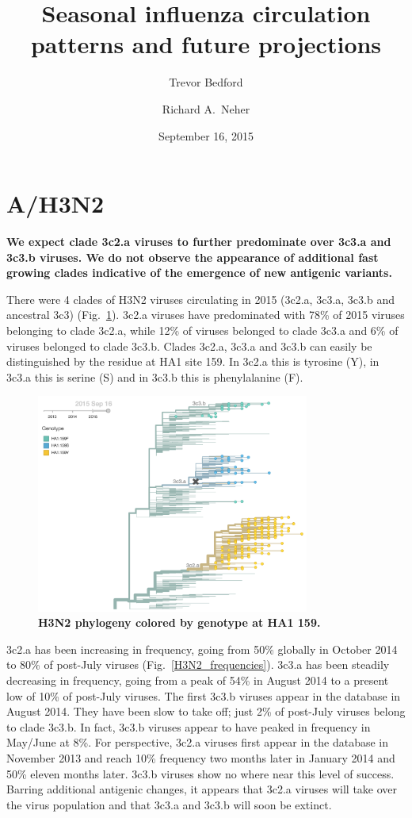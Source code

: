 \documentclass[11pt,oneside,letterpaper]{article}
\title{\vspace{2cm} \Large \bf 
Seasonal influenza circulation patterns and future projections
}
\author[1]{Trevor Bedford}
\author[2]{Richard A.\ Neher}
\affil[1]{Vaccine and Infectious Disease Division, Fred Hutchinson Cancer Research Center, Seattle, WA, USA.}
\affil[2]{Max Planck Institute for Developmental Biology, T\"ubingen, Germany.}
\date{September 16, 2015}
\begin{document}
\maketitle

\pagebreak

\section*{A/H3N2}

\textbf{We expect clade 3c2.a viruses to further predominate over 3c3.a and 3c3.b viruses. We do not observe the appearance of additional fast growing clades indicative of the emergence of new antigenic variants.}

There were 4 clades of H3N2 viruses circulating in 2015 (3c2.a, 3c3.a, 3c3.b and ancestral 3c3) (Fig.~\ref{H3N2_HA1-159}). 3c2.a viruses have predominated with 78\% of 2015 viruses belonging to clade 3c2.a, while 12\% of viruses belonged to clade 3c3.a and 6\% of viruses belonged to clade 3c3.b. Clades 3c2.a, 3c3.a and 3c3.b can easily be distinguished by the residue at HA1 site 159. In 3c2.a this is tyrosine (Y), in 3c3.a this is serine (S) and in 3c3.b this is phenylalanine (F).

\begin{figure}[h!]
	\centering		
	\includegraphics[width=0.8\textwidth]{../figures/sep-2015/H3N2_HA1-159.png}
	\caption{\textbf{H3N2 phylogeny colored by genotype at HA1 159.} 
	}
	\label{H3N2_HA1-159}
\end{figure}

3c2.a has been increasing in frequency, going from 50\% globally in October 2014 to 80\% of post-July viruses (Fig.~\ref{H3N2_frequencies}). 3c3.a has been steadily decreasing in frequency, going from a peak of 54\% in August 2014 to a present low of 10\% of post-July viruses. The first 3c3.b viruses appear in the database in August 2014. They have been slow to take off; just 2\% of post-July viruses belong to clade 3c3.b. In fact, 3c3.b viruses appear to have peaked in frequency in May/June at 8\%. For perspective, 3c2.a viruses first appear in the database in November 2013 and reach 10\% frequency two months later in January 2014 and 50\% eleven months later. 3c3.b viruses show no where near this level of success. Barring additional antigenic changes, it appears that 3c2.a viruses will take over the virus population and that 3c3.a and 3c3.b will soon be extinct.
\end{document}

